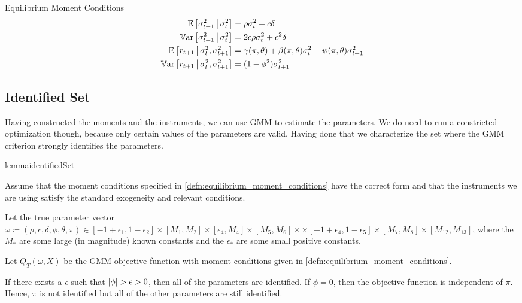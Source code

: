 \documentclass[11pt, letterpaper, twoside]{article}
\begin{document}
\begin{defn}{Equilibrium Moment Conditions}
 \label{defn:equilibrium_moment_conditions}
 \begin{align}
  \label{eqn:cond_vol_mean}
  \E\left[\sigma^2_{t+1} \mvert \sigma^2_t \right] &= \rho \sigma^2_t + c \delta\\
%
  \label{eqn:cond_vol_var}
  \Var\left[\sigma^2_{t+1} \mvert \sigma^2_t \right] &= 2 c \rho \sigma^2_t + c^2 \delta \\
%
  \label{eqn:cond_expected_rtn_moment}
  \E\left[r_{t+1} \mvert \sigma^2_t, \sigma^2_{t+1}\right] &= \gamma(\pi, \theta) + \beta(\pi, \theta)
  \sigma^2_t + \psi(\pi, \theta) \sigma^2_{t+1} \\
%
  \label{eqn:cond_rtn_var}
  \Var\left[r_{t+1} \mvert \sigma^2_t, \sigma^2_{t+1}\right] &= (1 - \phi^2) \sigma^2_{t+1} 
\end{align}
\end{defn}


\subsection{Identified Set}\label{sec:identified_set}

Having constructed the moments and the instruments, we can use GMM to estimate the parameters. We do need to run a constricted optimization though, because only certain values of the parameters are valid. Having done that we characterize the set where the GMM criterion strongly identifies the parameters.

\begin{restatable}{lemma}{identifiedSet}

 Assume that the moment conditions specified in \cref{defn:equilibrium_moment_conditions} have the correct form
 and that the instruments we are using satisfy the standard exogeneity and relevant conditions. 

 Let the true parameter vector $\omega \coloneqq (\rho, c, \delta, \phi, \theta, \pi) \in [-1+\epsilon_1,
 1 - \epsilon_2] \times [M_1, M_2] \times [\epsilon_4, M_4]\times [M_5, M_6]\times \times [-1 +
 \epsilon_4, 1 - \epsilon_5] \times [M_7, M_8] \times [M_12, M_13]$, where the $M_{\ast}$ are some large (in
 magnitude) known constants and the $\epsilon_{\ast}$ are some small positive constants. 

 Let $Q_T(\omega, X)$ be the GMM objective function with moment conditions given in
 \cref{defn:equilibrium_moment_conditions}. 

 If there exists a $\epsilon$ such that $\lvert\phi\rvert > \epsilon > 0$, then all of the parameters are identified. 
 If $\phi = 0$, then the objective function is independent of $\pi$. 
 Hence, $\pi$ is not identified but all of the other parameters are still identified.

\end{restatable}
\end{document}
